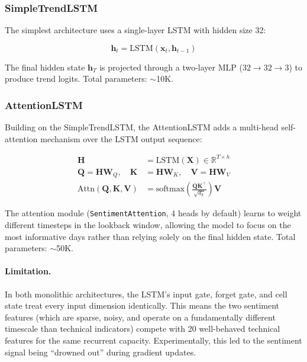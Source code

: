 \subsubsection{SimpleTrendLSTM}

The simplest architecture uses a single-layer LSTM with hidden size 32:

\begin{equation}
  \mathbf{h}_t = \text{LSTM}(\mathbf{x}_t, \mathbf{h}_{t-1})
  \label{eq:simple-lstm}
\end{equation}

The final hidden state $\mathbf{h}_T$ is projected through a two-layer MLP
($32 \to 32 \to 3$) to produce trend logits.  Total parameters: ${\sim}$10K.

\subsubsection{AttentionLSTM}

Building on the SimpleTrendLSTM, the AttentionLSTM adds a multi-head
self-attention mechanism over the LSTM output sequence:

\begin{align}
  \mathbf{H} &= \text{LSTM}(\mathbf{X}) \in \mathbb{R}^{T \times h} \\
  \mathbf{Q} = \mathbf{H}\mathbf{W}_Q,\quad
  \mathbf{K} &= \mathbf{H}\mathbf{W}_K,\quad
  \mathbf{V} = \mathbf{H}\mathbf{W}_V \\
  \text{Attn}(\mathbf{Q}, \mathbf{K}, \mathbf{V}) &=
    \text{softmax}\!\left(\frac{\mathbf{Q}\mathbf{K}^\top}{\sqrt{d_k}}\right)
    \mathbf{V}
  \label{eq:attention}
\end{align}

The attention module (\texttt{SentimentAttention}, 4 heads by default) learns to
weight different timesteps in the lookback window, allowing the model to focus
on the most informative days rather than relying solely on the final hidden
state.  Total parameters: ${\sim}$50K.

\paragraph{Limitation.}
In both monolithic architectures, the LSTM's input gate, forget gate, and cell
state treat every input dimension identically.  This means the two sentiment
features (which are sparse, noisy, and operate on a fundamentally different
timescale than technical indicators) compete with 20 well-behaved technical
features for the same recurrent capacity.  Experimentally, this led to the
sentiment signal being ``drowned out'' during gradient updates.

